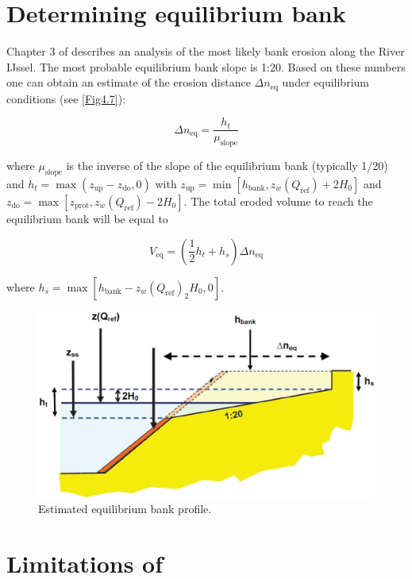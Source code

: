 \section{Determining equilibrium bank} \label{Sec4.6}

Chapter 3 of \citet{MarkSBMV11} describes an analysis of the most likely bank erosion along the River IJssel.
The most probable equilibrium bank slope is 1:20.
Based on these numbers one can obtain an estimate of the erosion distance $\Delta n_\text{eq}$ under equilibrium conditions (see \autoref{Fig4.7}):

\begin{equation}
\Delta n_\text{eq} = \frac{h_t}{\mu_\text{slope}}
\end{equation}

where $\mu_\text{slope}$ is the inverse of the slope of the equilibrium bank (typically 1/20) and $h_t = \max (z_\text{up} - z_\text{do}, 0)$ with $z_\text{up} = \min [ h_\text{bank}, z_w(Q_\text{ref}) + 2 H_0]$ and $z_\text{do} = \max [ z_\text{prot}, z_w(Q_\text{ref}) - 2 H_0 ]$.
The total eroded volume to reach the equilibrium bank will be equal to

\begin{equation}
V_\text{eq} = ( \frac{1}{2} h_t + h_s ) \Delta n_\text{eq}
\end{equation}

where $h_s = \max [ h_\text{bank} - z_w(Q_\text{ref}) _ 2 H_0, 0 ]$.


\begin{figure}
\includegraphics[width=\textwidth]{figures/Fig4-7.png}
\caption{Estimated equilibrium bank profile.}
\label{Fig4.7}
\end{figure}

\section{Limitations of \dfastbe} \label{Sec4.7}

